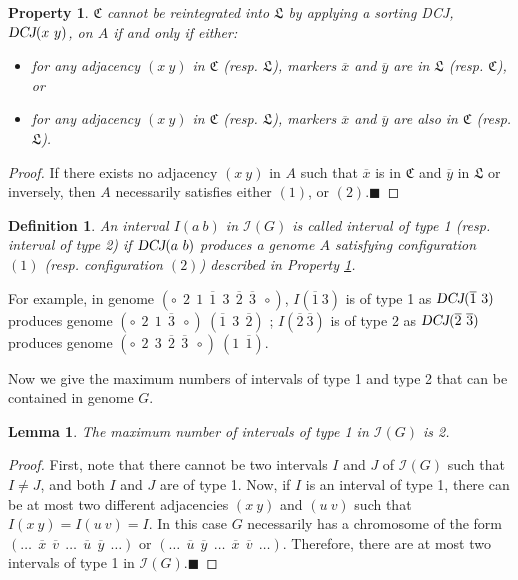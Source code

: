 \documentclass[11pt,final,twoside,nofrench]{thlifl}
\newcommand{\qed}{\ensuremath{\blacksquare}}
\newcommand{\fst}[1]{ \ensuremath{#1} }
\newcommand{\snd}[1]{ \ensuremath{\overline{#1}} }
\newcommand\aff[2]{\ensuremath{(\fst{#1}~\fst{#2})}}
\newcommand\asf[2]{\ensuremath{(\snd{#1}~\fst{#2})}}
\newcommand\ass[2]{\ensuremath{(\snd{#1}~\snd{#2})}}
\def\DCJ{\ensuremath{\mbox{\sl DCJ}}}
\newtheorem{property}{Property}
\newtheorem{proof}{Proof}
\newtheorem{lemma}{Lemma}
\newtheorem{definition}{Definition}
\begin{document}
\begin{property}
$\mathfrak{C}$ \emph{cannot} be reintegrated into $\mathfrak{L}$ by
applying a sorting DCJ,  $\DCJ\aff{x}{y}$, on $A$ if and only if either:

\begin{itemize} 
\item[(1)] for any adjacency $\aff{x}{y}$ in $\mathfrak{C}$
  (resp. $\mathfrak{L}$), markers $\snd{x}$ and $\snd{y}$ are in
  $\mathfrak{L}$ (resp. $\mathfrak{C}$), or

\item[(2)] for any adjacency $\aff{x}{y}$ in $\mathfrak{C}$ (resp. $\mathfrak{L}$), markers $\snd{x}$ and $\snd{y}$ are also in $\mathfrak{C}$ (resp. $\mathfrak{L}$). 

\end{itemize}

\label{formuleENR}
\end{property}
\begin{proof}
If there exists no  adjacency $\aff{x}{y}$ in $A$ such that $\snd{x}$ is in $\mathfrak{C}$ and $\snd{y}$ in $\mathfrak{L}$ or inversely, then $A$ necessarily satisfies either $(1)$, or $(2)$.\qed 
\end{proof}

\begin{definition}
An interval $I\aff{a}{b}$ in  $\mathcal{I}(G)$ is called
\emph{interval of type 1} (resp. \emph{interval of type 2}) if $\DCJ\aff{a}{b}$ produces a genome $A$ satisfying configuration $(1)$  (resp.  configuration $(2)$) described in Property \ref{formuleENR}.

\end{definition}

For example, in genome  $(\circ~~\fst{2}~~\fst{1}~~\snd{1}~~\fst{3}~~\snd{2}~~\snd{3}~~\circ)$,  $I\asf{1}{3}$ is of type 1 as  $\DCJ\asf{1}{3}$ produces genome 
$(\circ~~\fst{2}~~\fst{1}~~\snd{3}~~\circ) ~ (\snd{1}~~\fst{3}~~\snd{2})$ ;  $I\ass{2}{3}$ is of type 2 as  $\DCJ\ass{2}{3}$ produces genome  $(\circ~~\fst{2}~~\fst{3}~~\snd{2}~~\snd{3}~~\circ) ~ (\fst{1}~~\snd{1})$.

Now we give the maximum numbers of intervals of type 1 and type 2 that can be contained in genome $G$.

\begin{lemma}
The maximum number of intervals of type 1 in $\mathcal{I}(G)$ is 2.
\label{maxType1}
\end{lemma}

\begin{proof}
First, note that there cannot be two intervals $I$ and $J$ of $\mathcal{I}(G)$ 
such that $I \neq J$, and both  $I$ and $J$ are of type 1.
Now, if $I$ is an interval of type 1, there can be at most two different 
adjacencies $\aff{x}{y}$ and $\aff{u}{v}$ such that 
$I\aff{x}{y} = I\aff{u}{v} = I$. In this case $G$ necessarily has a chromosome of the form $(\ldots ~~\snd{x}~~\snd{v}~~\ldots ~~\snd{u}~~\snd{y}~~\ldots)$ or $(\ldots ~~\snd{u}~~\snd{y}~~\ldots ~~\snd{x}~~\snd{v}~~\ldots)$.
Therefore, there are at most two intervals of type 1 in $\mathcal{I}(G)$.\qed

\end{proof}
\end{document}
